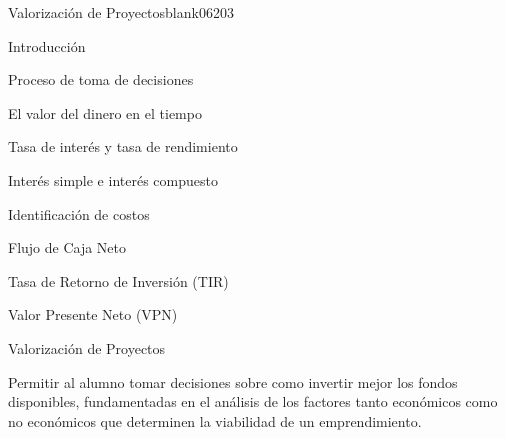 \begin{syllabus}
\begin{unit}{Valorización de Proyectos}{blank06}{20}{3}
\begin{topics}
      \item Introducción
       \item Proceso de toma de decisiones
       \item El valor del dinero en el tiempo
       \item Tasa de interés y tasa de rendimiento
       \item Interés simple e interés compuesto
       \item Identificación de costos
       \item Flujo de Caja Neto
       \item Tasa de Retorno de Inversión (TIR)
      \item Valor Presente Neto (VPN)
       \item Valorización de Proyectos
   \end{topics}
   \begin{learningoutcomes}
      \item Permitir al alumno tomar decisiones sobre como invertir mejor los fondos disponibles, fundamentadas en el análisis de los factores tanto económicos como no económicos que determinen la viabilidad de un emprendimiento.
   \end{learningoutcomes}
\end{unit}


\end{syllabus}
